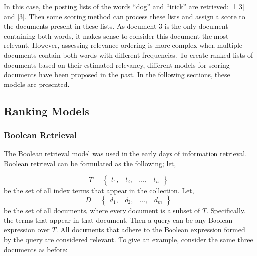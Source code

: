 In this case, the posting lists of the words ``dog'' and ``trick'' are retrieved: [1 3] and [3]. Then some scoring method can process these lists and assign a score to the documents present in these lists. As document 3 is the only document containing both words, it makes sense to consider this document the most relevant. However, assessing relevance ordering is more complex when multiple documents contain both words with different frequencies. 
To create ranked lists of documents based on their estimated relevancy, different models for scoring documents have been proposed in the past. In the following sections, these models are presented.

\subsection{Ranking Models}

\subsubsection{Boolean Retrieval}
The Boolean retrieval model was used in the early days of information retrieval. Boolean retrieval can be formulated as the following; let, 

\begin{equation}
	T = \begin{Bmatrix}
		t_1, & t_2, & \ldots, & t_n
	\end{Bmatrix}
\end{equation}
be the set of all index terms that appear in the collection. Let,
\begin{equation}
	D = \begin{Bmatrix}
		d_1, & d_2, & \ldots, & d_m
	\end{Bmatrix}
\end{equation}
be the set of all documents, where every document is a subset of $T$. Specifically, the terms that appear in that document. Then a query can be any Boolean expression over $T$. All documents that adhere to the Boolean expression formed by the query are considered relevant. To give an example, consider the same three documents as before:

